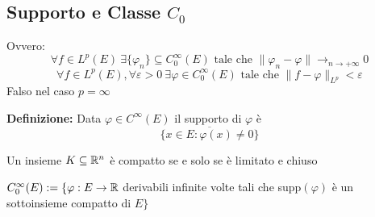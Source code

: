 
\subsection{Supporto e Classe $C_0$}
Ovvero:
\[\forall f \in L^{p}(E)\ \exists \{ \varphi_n\}	\subseteq  C_0^\infty(E) \text{ tale che } \|\varphi_n -\varphi\|\to _{n\to +\infty}0\]
\[\forall f\in L^{p}(E),\forall \varepsilon>0\ \exists \varphi\in C_0^\infty(E)\text{ tale che }\|f-\varphi\|_{L^{p}}<\varepsilon
\] 
Falso nel caso $p=\infty$
\begin{tcolorbox}
	\textbf{Definizione:} Data $\varphi\in C^\infty(E)$ il supporto di $\varphi$ è 
	\[\overline{\{x\in E:\varphi(x)\neq 0\}} \]
\end{tcolorbox}
\begin{tcolorbox}
	Un insieme $K\subseteq  \mathbb{R}^n$ è compatto se e solo se è limitato e chiuso
\end{tcolorbox}
\begin{tcolorbox}
	$C_0^\infty(E):=\{\varphi :E\to \mathbb{R}$ derivabili infinite volte tali che supp$(\varphi)$ è un sottoinsieme compatto di $E\} $
\end{tcolorbox}
